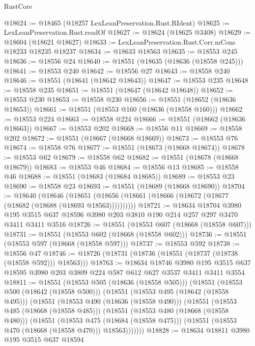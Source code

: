 \begin{lexlean}{RustCore}
\begin{coremodule}
@18624 := @18465 (@18257 LexLeanPreservation.Rust.RIdent)
@18625 := LexLeanPreservation.Rust.readOf
@18627 := @18624 (@18625 @3408)
@18629 := @18604 (@18621 @18627)
@18633 := LexLeanPreservation.Rust.Corr.mCons @18233 @18235 @18237
@18634 := @18633 @18563
@18635 := @18553 @245
@18636 := @18556 @24
@18640 := @18551 (@18635 (@18636 (@18558 @245)))
@18641 := @18553 @240
@18642 := @18556 @27
@18643 := @18558 @240
@18646 := @18551 (@18641 (@18642 @18643))
@18647 := @18553 @235
@18648 := @18558 @235
@18651 := @18551 (@18647 (@18642 @18648))
@18652 := @18553 @230
@18653 := @18558 @230
@18656 := @18551 (@18652 (@18636 @18653))
@18661 := @18551 (@18553 @160 (@18636 (@18558 @160)))
@18662 := @18553 @224
@18663 := @18558 @224
@18666 := @18551 (@18662 (@18636 @18663))
@18667 := @18553 @202
@18668 := @18556 @11
@18669 := @18558 @202
@18672 := @18551 (@18667 (@18668 @18669))
@18673 := @18553 @76
@18674 := @18558 @76
@18677 := @18551 (@18673 (@18668 @18674))
@18678 := @18553 @62
@18679 := @18558 @62
@18682 := @18551 (@18678 (@18668 @18679))
@18683 := @18553 @46
@18684 := @18556 @13
@18685 := @18558 @46
@18688 := @18551 (@18683 (@18684 @18685))
@18689 := @18553 @23
@18690 := @18558 @23
@18693 := @18551 (@18689 (@18668 @18690))
@18704 := @18640
    (@18646 (@18651 (@18656 (@18661 (@18666 (@18672 (@18677 (@18682 (@18688 (@18693 @18563))))))))))
@18721 := @18634
    @18704
    @3980
    @195
    @3515
    @637
    @18596
    @3980
    @203
    @3810
    @190
    @214
    @257
    @297
    @3470
    @3411
    @3411
    @3516
@18726 := @18551 (@18553 @607 (@18668 (@18558 @607)))
@18731 := @18551 (@18553 @602 (@18668 (@18558 @602)))
@18736 := @18551 (@18553 @597 (@18668 (@18558 @597)))
@18737 := @18553 @592
@18738 := @18556 @47
@18746 := @18726 (@18731 (@18736 (@18551 (@18737 (@18738 (@18558 @592))) @18563)))
@18763 := @18634
    @18746
    @3980
    @195
    @3515
    @637
    @18595
    @3980
    @203
    @3809
    @224
    @587
    @612
    @627
    @3537
    @3411
    @3411
    @3554
@18811 := @18551
    (@18553 @505 (@18636 (@18558 @505)))
    (@18551
      (@18553 @500 (@18642 (@18558 @500)))
      (@18551
        (@18553 @495 (@18642 (@18558 @495)))
        (@18551
          (@18553 @490 (@18636 (@18558 @490)))
          (@18551
            (@18553 @485 (@18668 (@18558 @485)))
            (@18551
              (@18553 @480 (@18668 (@18558 @480)))
              (@18551
                (@18553 @475 (@18684 (@18558 @475)))
                (@18551 (@18553 @470 (@18668 (@18558 @470))) @18563)))))))
@18828 := @18634
    @18811
    @3980
    @195
    @3515
    @637
    @18594

\end{coremodule}
\end{lexlean}
